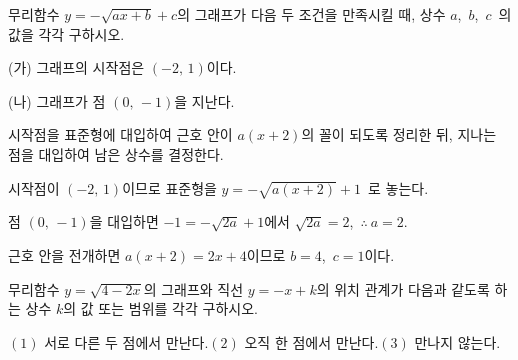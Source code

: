 \documentclass[10pt]{article}
\begin{document}
\newpage


\begin{dmproblem}
무리함수 $y = -\sqrt{ax + b} + c$의 그래프가 다음 두 조건을 만족시킬 때, 상수 $a$,\ $b$,\ $c$\ 의 값을 각각 구하시오.
\begin{dmoptionbox}
(가) 그래프의 시작점은 $(-2,\, 1)$이다.

(나) 그래프가 점 $(0,\, -1)$을 지난다.
\end{dmoptionbox}
\end{dmproblem}

\begin{dmapproach}
시작점을 표준형에 대입하여 근호 안이 $a(x + 2)$의 꼴이 되도록 정리한 뒤, 지나는 점을 대입하여 남은 상수를 결정한다.
\end{dmapproach}

\begin{dmsolution}
시작점이 $(-2,\, 1)$이므로 표준형을 $y = -\sqrt{a(x + 2)} + 1$\ 로 놓는다.

점 $(0,\, -1)$을 대입하면 $-1 = -\sqrt{2a} + 1$에서 $\sqrt{2a} = 2$,\ $\therefore\ a = 2$.

근호 안을 전개하면 $a(x + 2) = 2x + 4$이므로 $b = 4$,\ $c = 1$이다.
\end{dmsolution}

\dmchecktitle



\newpage


\begin{dmproblem}
무리함수 $y = \sqrt{4 - 2x}$의 그래프와 직선 $y = -x + k$의 위치 관계가 다음과 같도록 하는 상수 $k$의 값 또는 범위를 각각 구하시오.

\vspace{3mm}

\noindent$(1)$ 서로 다른 두 점에서 만난다.\hfill$(2)$ 오직 한 점에서 만난다.\hfill$(3)$ 만나지 않는다.\hfill\null
\end{dmproblem}
\end{document}
